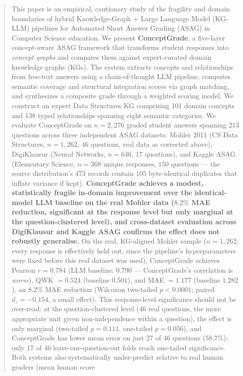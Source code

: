\documentclass[conference]{IEEEtran}
\begin{document}
\begin{abstract}
This paper is an empirical, cautionary study of the fragility and
domain boundaries of hybrid Knowledge-Graph + Large Language Model
(KG-LLM) pipelines for Automated Short Answer Grading (ASAG) in
Computer Science education. We present \textbf{ConceptGrade}, a
five-layer concept-aware ASAG framework that transforms student
responses into \emph{concept graphs} and compares them against
expert-curated domain knowledge graphs (KGs). The system extracts concepts and relationships from free-text
answers using a chain-of-thought LLM pipeline, computes semantic coverage and
structural integration scores via graph matching, and synthesizes a composite
grade through a weighted scoring model. We construct an expert Data Structures KG
comprising 101 domain concepts and 138 typed relationships spanning eight semantic
categories. We evaluate ConceptGrade on \(n = 2{,}276\) graded student
answers spanning \(213\) questions across three independent ASAG datasets:
Mohler 2011 (CS Data Structures, $n = 1{,}262$, $46$ questions, real data
as corrected above), DigiKlausur
(Neural Networks, $n = 646$, $17$ questions), and Kaggle ASAG (Elementary
Science, $n = 368$ unique responses, $150$ questions --- the source
distribution's $473$ records contain $105$ byte-identical duplicates that
inflate variance if kept). \textbf{ConceptGrade achieves a modest, statistically fragile
in-domain improvement over the identical-model LLM baseline on the real Mohler
data ($8.2\%$ MAE reduction, significant at the response level but only
marginal at the question-clustered level), and cross-dataset evaluation across
DigiKlausur and Kaggle ASAG confirms the effect does not robustly
generalise.} On the real, KG-aligned Mohler sample ($n=1{,}262$; every
response is effectively held out, since the pipeline's hyperparameters
were fixed before this real dataset was used), ConceptGrade achieves
Pearson $r = 0.784$ (LLM baseline: $0.790$ --- ConceptGrade's correlation
is \emph{worse}), QWK $= 0.524$ (baseline $0.501$), and MAE $= 1.177$
(baseline $1.282$), an $8.2\%$ MAE reduction (Wilcoxon two-tailed
$p < 0.0001$; paired $d_z = -0.154$, a small effect). This response-level
significance should not be over-read: at the question-clustered level
(46 real questions, the more appropriate unit given non-independence
within a question), the effect is only marginal (two-tailed $p=0.111$,
one-tailed $p=0.056$), and ConceptGrade has lower mean error on just
27 of 46 questions ($58.7\%$); only 17 of 46 leave-one-question-out
folds reach one-tailed significance. Both systems also systematically
under-predict relative to real human graders (mean human score

\end{abstract}
\end{document}
